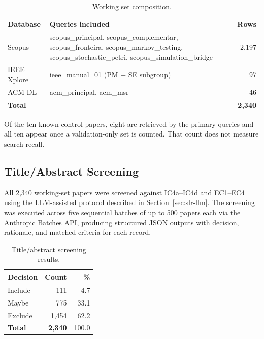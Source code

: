 \begin{table}[htbp]
\centering
\caption{Working set composition.}
\label{tab:working-set}
\small
\setlength{\tabcolsep}{4pt}
\begin{tabular}{p{2.2cm} p{8.3cm} r}
\toprule
\textbf{Database} & \textbf{Queries included} & \textbf{Rows} \\
\midrule
Scopus & scopus\_principal, scopus\_complementar, scopus\_fronteira,
         scopus\_markov\_testing, scopus\_stochastic\_petri,
         scopus\_simulation\_bridge & 2{,}197 \\
IEEE Xplore & ieee\_manual\_01 (PM + SE subgroup) & 97 \\
ACM DL & acm\_principal, acm\_msr & 46 \\
\midrule
\textbf{Total} & & \textbf{2{,}340} \\
\bottomrule
\end{tabular}
\end{table}

Of the ten known control papers, eight are retrieved by the primary
queries and all ten appear once a validation-only set is counted. That
count does not measure search recall.

\subsection{Title/Abstract Screening}

All 2{,}340 working-set papers were screened against IC4a--IC4d and EC1--EC4
using the LLM-assisted protocol described in Section~\ref{sec:slr-llm}. The
screening was executed across five sequential batches of up to 500 papers each
via the Anthropic Batches API, producing structured JSON outputs with decision,
rationale, and matched criteria for each record.

\begin{table}[htbp]
\centering
\caption{Title/abstract screening results.}
\label{tab:ta-screening}
\begin{tabular}{lrr}
\toprule
\textbf{Decision} & \textbf{Count} & \textbf{\%} \\
\midrule
Include & 111 & 4.7 \\
Maybe   & 775 & 33.1 \\
Exclude & 1{,}454 & 62.2 \\
\midrule
\textbf{Total} & \textbf{2{,}340} & 100.0 \\
\bottomrule
\end{tabular}
\end{table}

